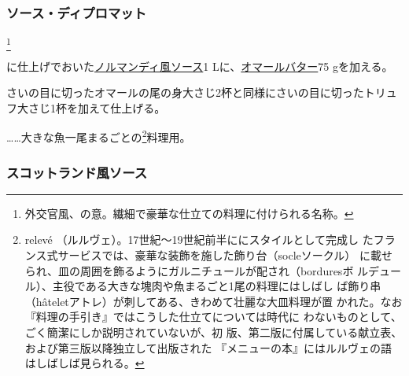 \begin{recette}
\hypertarget{sauce-diplomate}{%
\subsubsection{ソース・ディプロマット}\label{sauce-diplomate}}

\footnote{外交官風、の意。繊細で豪華な仕立ての料理に付けられる名称。}


に仕上げでおいた\protect\hyperlink{sauce-normande}{ノルマンディ風ソース}1
Lに、\protect\hyperlink{}{オマールバター}75 gを加える。

さいの目に切ったオマールの尾の身大さじ2杯と同様にさいの目に切ったトリュ
フ大さじ1杯を加えて仕上げる。

\ldots{}\ldots{}大きな魚一尾まるごとの\footnote{relevé
  （ルルヴェ）。17世紀〜19世紀前半ににスタイルとして完成し
  たフランス式サービスでは、豪華な装飾を施した飾り台（socleソークル）
  に載せられ、皿の周囲を飾るようにガルニチュールが配され（borduresボ
  ルデュール）、主役である大きな塊肉や魚まるごと1尾の料理にはしばし
  ば飾り串（hâteletアトレ）が刺してある、きわめて壮麗な大皿料理が置
  かれた。なお『料理の手引き』ではこうした仕立てについては時代に
  わないものとして、ごく簡潔にしか説明されていないが、初
  版、第二版に付属している献立表、および第三版以降独立して出版された
  『メニューの本』にはルルヴェの語はしばしば見られる。}料理用。

\maeaki

\hypertarget{sauce-ecossaise}{%
\subsubsection{スコットランド風ソース}\label{sauce-ecossaise}}




\end{recette}
